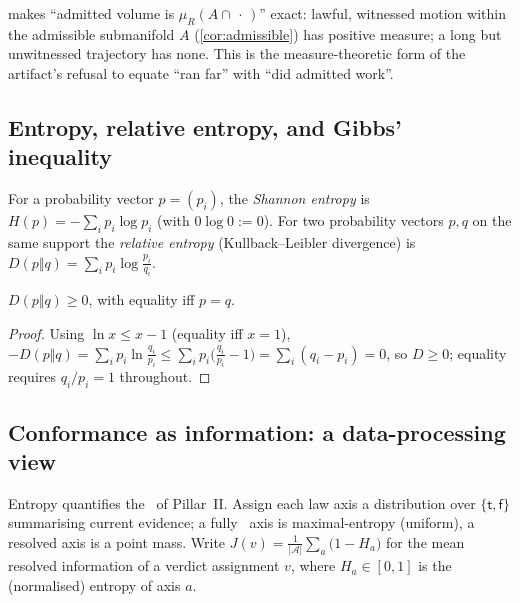  makes ``admitted volume is $\mu_R(A\cap\,\cdot\,)$''
exact: lawful, witnessed motion within the admissible submanifold $A$
(\cref{cor:admissible}) has positive measure; a long but unwitnessed trajectory has
none. This is the measure-theoretic form of the artifact's refusal to equate
``ran far'' with ``did admitted work''.

\subsection{Entropy, relative entropy, and Gibbs' inequality}
\label{sec:meas-entropy}

\begin{definition}
For a probability vector $p=(p_i)$, the \emph{Shannon entropy} is
$H(p)=-\sum_i p_i\log p_i$ (with $0\log 0:=0$). For two probability vectors $p,q$ on
the same support the \emph{relative entropy} (Kullback--Leibler divergence) is
$D(p\Vert q)=\sum_i p_i\log\tfrac{p_i}{q_i}$.
\end{definition}

\begin{lemma}
\label{lem:gibbs}
$D(p\Vert q)\ge 0$, with equality iff $p=q$.
\end{lemma}
\begin{proof}
Using $\ln x\le x-1$ (equality iff $x=1$),
$-D(p\Vert q)=\sum_i p_i\ln\tfrac{q_i}{p_i}\le\sum_i p_i\bigl(\tfrac{q_i}{p_i}-1\bigr)
=\sum_i(q_i-p_i)=0$, so $D\ge 0$; equality requires $q_i/p_i=1$ throughout.
\end{proof}

\subsection{Conformance as information: a data-processing view}
\label{sec:meas-dpi}

Entropy quantifies the \unknownstat\ of Pillar~II. Assign each law axis a
distribution over $\{\mathsf t,\mathsf f\}$ summarising current evidence; a fully
\unknownstat\ axis is maximal-entropy (uniform), a resolved axis is a point mass.
Write $J(v)=\tfrac{1}{|\mathcal A|}\sum_{a}\bigl(1-H_a\bigr)$ for the mean resolved
information of a verdict assignment $v$, where $H_a\in[0,1]$ is the (normalised)
entropy of axis $a$.

